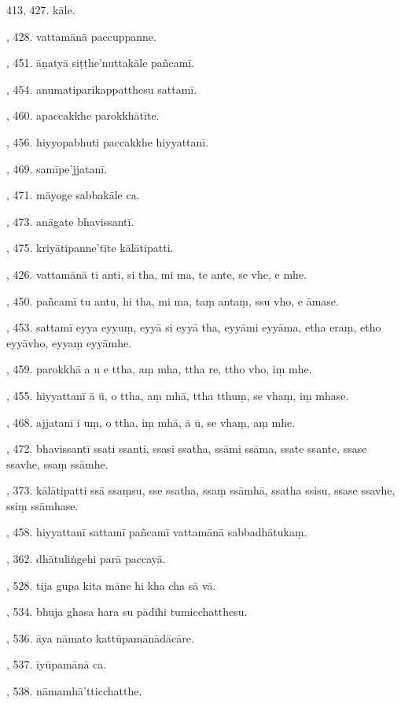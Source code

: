 413, 427. kāle.\par {}, 428. vattamānā paccuppanne.\par {}, 451. āṇatyā siṭṭhe’nuttakāle pañcamī.\par {}, 454. anumatiparikappatthesu sattamī.\par {}, 460. apaccakkhe parokkhātīte.\par {}, 456. hiyyopabhuti paccakkhe hiyyattanī.\par {}, 469. samīpe’jjatanī.\par {}, 471. māyoge sabbakāle ca.\par {}, 473. anāgate bhavissantī.\par {}, 475. kriyātipanne’tīte kālātipatti.\par {}, 426. vattamānā ti anti, si tha, mi ma, te ante, se vhe, e mhe.\par {}, 450. pañcamī tu antu, hi tha, mi ma, taṃ antaṃ, ssu vho, e āmase.\par {}, 453. sattamī eyya eyyuṃ, eyyā si eyyā tha, eyyāmi eyyāma, etha eraṃ, etho eyyāvho, eyyaṃ eyyāmhe.\par {}, 459. parokkhā a u e ttha, aṃ mha, ttha re, ttho vho, iṃ mhe.\par {}, 455. hiyyattanī ā ū, o ttha, aṃ mhā, ttha tthuṃ, se vhaṃ, iṃ mhase.\par {}, 468. ajjatanī ī uṃ, o ttha, iṃ mhā, ā ū, se vhaṃ, aṃ mhe.\par {}, 472. bhavissantī ssati ssanti, ssasi ssatha, ssāmi ssāma, ssate ssante, ssase ssavhe, ssaṃ ssāmhe.\par {}, 373. kālātipatti ssā ssaṃsu, sse ssatha, ssaṃ ssāmhā, ssatha ssisu, ssase ssavhe, ssiṃ ssāmhase.\par {}, 458. hiyyattanī sattamī pañcamī vattamānā sabbadhātukaṃ.\par {}, 362. dhātuliṅgehi parā paccayā.\par {}, 528. tija gupa kita māne hi kha cha sā vā.\par {}, 534. bhuja ghasa hara su pādīhi tumicchatthesu.\par {}, 536. āya nāmato kattūpamānādācāre.\par {}, 537. īyūpamānā ca.\par {}, 538. nāmamhā’tticchatthe.\par \noindent
